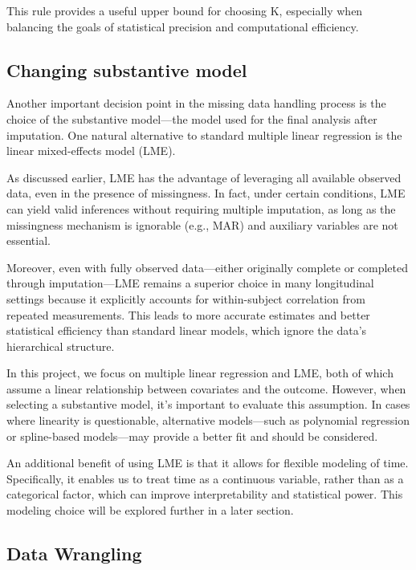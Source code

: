\documentclass{article}
\begin{document}
This rule provides a useful upper bound for choosing K, especially when
balancing the goals of statistical precision and computational
efficiency.

\subsection{Changing substantive
model}\label{changing-substantive-model}

Another important decision point in the missing data handling process is
the choice of the substantive model---the model used for the final
analysis after imputation. One natural alternative to standard multiple
linear regression is the linear mixed-effects model (LME).

As discussed earlier, LME has the advantage of leveraging all available
observed data, even in the presence of missingness. In fact, under
certain conditions, LME can yield valid inferences without requiring
multiple imputation, as long as the missingness mechanism is ignorable
(e.g., MAR) and auxiliary variables are not essential.

Moreover, even with fully observed data---either originally complete or
completed through imputation---LME remains a superior choice in many
longitudinal settings because it explicitly accounts for within-subject
correlation from repeated measurements. This leads to more accurate
estimates and better statistical efficiency than standard linear models,
which ignore the data's hierarchical structure.

In this project, we focus on multiple linear regression and LME, both of
which assume a linear relationship between covariates and the outcome.
However, when selecting a substantive model, it's important to evaluate
this assumption. In cases where linearity is questionable, alternative
models---such as polynomial regression or spline-based models---may
provide a better fit and should be considered.

An additional benefit of using LME is that it allows for flexible
modeling of time. Specifically, it enables us to treat time as a
continuous variable, rather than as a categorical factor, which can
improve interpretability and statistical power. This modeling choice
will be explored further in a later section.

\subsection{Data Wrangling}\label{data-wrangling}
\end{document}
